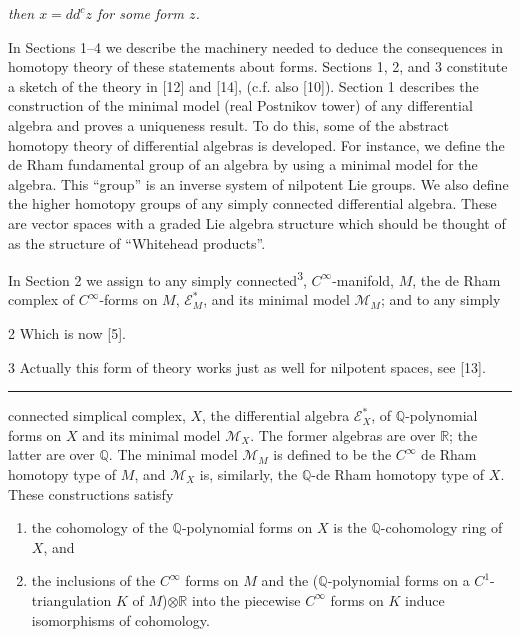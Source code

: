 \documentclass[
  english,
  a3paper,
  a3paper]{extarticle}
\begin{document}
\emph{then \(x=dd^c z\) for some form \(z\).}

In Sections 1--4 we describe the machinery needed to deduce the
consequences in homotopy theory of these statements about forms.
Sections 1, 2, and 3 constitute a sketch of the theory in {[}12{]} and
{[}14{]}, (c.f. also {[}10{]}). Section 1 describes the construction of
the minimal model (real Postnikov tower) of any differential algebra and
proves a uniqueness result. To do this, some of the abstract homotopy
theory of differential algebras is developed. For instance, we define
the de Rham fundamental group of an algebra by using a minimal model for
the algebra. This ``group'' is an inverse system of nilpotent Lie
groups. We also define the higher homotopy groups of any simply
connected differential algebra. These are vector spaces with a graded
Lie algebra structure which should be thought of as the structure of
``Whitehead products''.

In Section 2 we assign to any simply connected\textsuperscript{3},
\(C^\infty\)-manifold, \(M\), the de Rham complex of \(C^\infty\)-forms
on \(M\), \(\mathscr E_M^*\), and its minimal model \(\mathcal M_M\);
and to any simply

2 Which is now {[}5{]}.

3 Actually this form of theory works just as well for nilpotent spaces,
see {[}13{]}.

\clearpage



\par

\vspace{0.7mm}\hrule\vspace{1.6mm}

\fontsize{9}{11}\selectfont

connected simplical complex, \(X\), the differential algebra
\(\mathscr E_X^*\), of \(\mathbb Q\)-polynomial forms on \(X\) and its
minimal model \(\mathcal M_X\). The former algebras are over
\(\mathbb R\); the latter are over \(\mathbb Q\). The minimal model
\(\mathcal M_M\) is defined to be the \(C^\infty\) de Rham homotopy type
of \(M\), and \(\mathcal M_X\) is, similarly, the \(\mathbb Q\)-de Rham
homotopy type of \(X\). These constructions satisfy

\begin{enumerate}
\def\labelenumi{\alph{enumi})}
\item
  the cohomology of the \(\mathbb Q\)-polynomial forms on \(X\) is the
  \(\mathbb Q\)-cohomology ring of \(X\), and
\item
  the inclusions of the \(C^\infty\) forms on \(M\) and the
  (\(\mathbb Q\)-polynomial forms on a \(C^1\)-triangulation \(K\) of
  \(M\))\(\otimes\mathbb R\) into the piecewise \(C^\infty\) forms on
  \(K\) induce isomorphisms of cohomology.
\end{enumerate}
\end{document}
